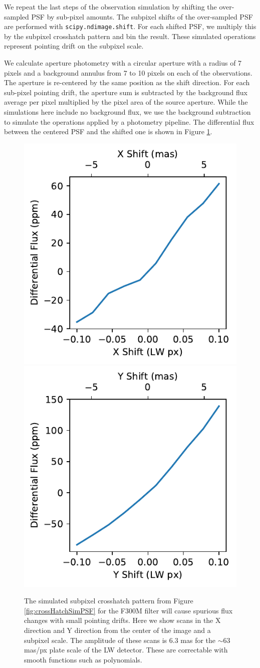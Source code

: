 \documentclass{aastex62}
\begin{document}
We repeat the last steps of the observation simulation by shifting the over-sampled PSF by sub-pixel amounts.
The subpixel shifts of the over-sampled PSF are performed with \texttt{scipy.ndimage.shift}.
For each shifted PSF, we multiply this by the subpixel crosshatch pattern and bin the result.
These simulated operations represent pointing drift on the subpixel scale.

We calculate aperture photometry with a circular aperture with a radius of 7 pixels and a background annulus from 7 to 10 pixels on each of the observations.
The aperture is re-centered by the same position as the shift direction.
For each sub-pixel pointing drift, the aperture sum is subtracted by the background flux average per pixel multiplied by the pixel area of the source aperture.
While the simulations here include no background flux, we use the background subtraction to simulate the operations applied by a photometry pipeline.
The differential flux between the centered PSF and the shifted one is shown in Figure \ref{fig:subpixScanSimulation}.


\begin{figure}[!hbtp]
\centering
\includegraphics[width=.49\columnwidth]{scan_F300M_x_short_scan.pdf}
\includegraphics[width=.49\columnwidth]{scan_F300M_y_short_scan.pdf}
\caption{
The simulated subpixel crosshatch pattern from Figure \ref{fig:crossHatchSimPSF} for the F300M filter will cause spurious flux changes with small pointing drifts.
Here we show scans in the X direction and Y direction from the center of the image and a subpixel scale.
The amplitude of these scans is 6.3 mas for the $\sim$63 mas/px plate scale of the LW detector.
These are correctable with smooth functions such as polynomials.
}\label{fig:subpixScanSimulation}
\end{figure}
\end{document}
